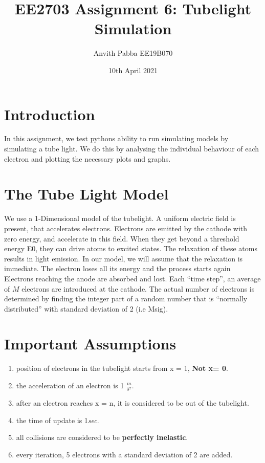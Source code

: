 \documentclass[11pt]{article}
\title{EE2703 Assignment 6: Tubelight Simulation}
\author{Anvith Pabba EE19B070}
\date{10th April 2021}
\begin{document}
\maketitle

\section{Introduction}
In this assignment, we test pythons ability to run simulating models by simulating a tube light. We do this by analysing the individual behaviour of each electron and plotting the necessary plots and graphs. 

\section{The Tube Light Model}
We use a 1-Dimensional model of the tubelight. A uniform electric field is present, that accelerates electrons. Electrons are emitted by the cathode with zero energy, and accelerate in this field. When they get
beyond a threshold energy E0, they can drive atoms to excited states. The relaxation of these atoms results
in light emission. In our model, we will assume that the relaxation is immediate. The electron loses all its
energy and the process starts again\\

Electrons reaching the anode are absorbed and lost. Each “time step”, an average of $M$ electrons are
introduced at the cathode. The actual number of electrons is determined by finding the integer part of a
random number that is “normally distributed” with standard deviation of 2 (i.e Msig).

\section{Important Assumptions}
\begin{enumerate}
    \item position of electrons in the tubelight starts from x = 1, \textbf{Not x= 0}.
    \item the acceleration of an electron is 1 $\frac{m}{s^2}$.
    \item after an electron reaches x = n, it is considered to be out of the tubelight.
    \item the time of update is 1\textit{sec}.
    \item all collisions are considered to be \textbf{perfectly inelastic}.
    \item every iteration, 5 electrons with a standard deviation of 2 are added.
\end{enumerate}
\end{document}
